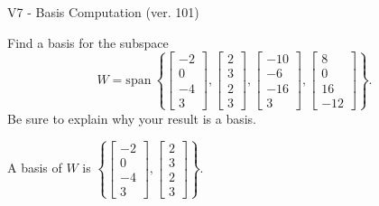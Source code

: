 \begin{exercise}
  \begin{exerciseTitle}V7 - Basis Computation (ver. 101)\end{exerciseTitle}
  \begin{exerciseStatement}
    Find a basis for the subspace 
\[W=\mathrm{span}\ \left\{\left[\begin{array}{r}
-2 \\
0 \\
-4 \\
3
\end{array}\right] , \left[\begin{array}{r}
2 \\
3 \\
2 \\
3
\end{array}\right] , \left[\begin{array}{r}
-10 \\
-6 \\
-16 \\
3
\end{array}\right] , \left[\begin{array}{r}
8 \\
0 \\
16 \\
-12
\end{array}\right]\right\}.\]
 Be sure to explain why your result is a basis.


  \end{exerciseStatement}
  \begin{exerciseAnswer}
   A basis of \(W\) is  \(\left\{\left[\begin{array}{r}
-2 \\
0 \\
-4 \\
3
\end{array}\right] , \left[\begin{array}{r}
2 \\
3 \\
2 \\
3
\end{array}\right]\right\}\).
  


  \end{exerciseAnswer}
\end{exercise}